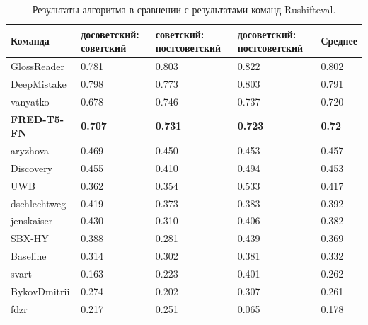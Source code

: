 \documentclass[LI,VKR]{HSEUniversity}
\begin{document}
\begin{table}[H]
\centering
\caption{Результаты алгоритма в сравнении с результатами команд Rushifteval.}
\begin{tabular}{|m{2.5cm}|m{3cm}|m{3cm}|m{3cm}|m{2.0cm}|}%
\hline
\textbf{Команда} & \textbf{досоветский:
советский} & \textbf{советский:
постсоветский} & \textbf{досоветский:
постсоветский} & \textbf{Среднее} \\%
\hline
GlossReader & 0.781 & 0.803 & 0.822 & 0.802 \\%
\hline
DeepMistake & 0.798 & 0.773 & 0.803 & 0.791 \\%
\hline
vanyatko & 0.678 & 0.746 & 0.737 & 0.720 \\%
\hline
\textbf{FRED-T5-FN} & \textbf{0.707} & \textbf{0.731} & \textbf{0.723} & \textbf{0.72} \\%
\hline
aryzhova & 0.469 & 0.450 & 0.453 & 0.457 \\%
\hline
Discovery & 0.455 & 0.410 & 0.494 & 0.453 \\%
\hline
UWB & 0.362 & 0.354 & 0.533 & 0.417 \\%
\hline
dschlechtweg & 0.419 & 0.373 & 0.383 & 0.392 \\%
\hline
jenskaiser & 0.430 & 0.310 & 0.406 & 0.382 \\%
\hline
SBX-HY & 0.388 & 0.281 & 0.439 & 0.369 \\%
\hline
Baseline & 0.314 & 0.302 & 0.381 & 0.332 \\%
\hline
svart & 0.163 & 0.223 & 0.401 & 0.262 \\%
\hline
BykovDmitrii & 0.274 & 0.202 & 0.307 & 0.261 \\%
\hline
fdzr & 0.217 & 0.251 & 0.065 & 0.178 & \\%
\hline
\end{tabular}
\end{table}
\end{document}
